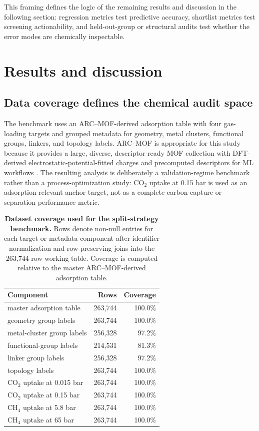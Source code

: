 \documentclass[11pt,a4paper]{article}
\begin{document}
This framing defines the logic of the remaining results and discussion in the following section: regression metrics test predictive accuracy, shortlist metrics test screening actionability, and held-out-group or structural audits test whether the error modes are chemically inspectable.


\section*{Results and discussion}
\subsection*{Data coverage defines the chemical audit space}
The benchmark uses an ARC--MOF-derived adsorption table with four gas-loading targets and grouped metadata for geometry, metal clusters, functional groups, linkers, and topology labels. ARC--MOF is appropriate for this study because it provides a large, diverse, descriptor-ready MOF collection with DFT-derived electrostatic-potential-fitted charges and precomputed descriptors for ML workflows \citep{Burner2023ARCMOF}. The resulting analysis is deliberately a validation-regime benchmark rather than a process-optimization study: CO$_2$ uptake at 0.15 bar is used as an adsorption-relevant anchor target, not as a complete carbon-capture or separation-performance metric.


\begin{table}[H]
\centering
\caption{\textbf{Dataset coverage used for the split-strategy benchmark.} Rows denote non-null entries for each target or metadata component after identifier normalization and row-preserving joins into the 263,744-row working table. Coverage is computed relative to the master ARC--MOF-derived adsorption table.}
\label{tab:coverage}
\begin{tabular}{lrr}
\toprule
Component & Rows & Coverage \\
\midrule
master adsorption table & 263,744 & 100.0\% \\
geometry group labels & 263,744 & 100.0\% \\
metal-cluster group labels & 256,328 & 97.2\% \\
functional-group labels & 214,531 & 81.3\% \\
linker group labels & 256,328 & 97.2\% \\
topology labels & 263,744 & 100.0\% \\
CO$_2$ uptake at 0.015 bar & 263,744 & 100.0\% \\
CO$_2$ uptake at 0.15 bar & 263,744 & 100.0\% \\
CH$_4$ uptake at 5.8 bar & 263,744 & 100.0\% \\
CH$_4$ uptake at 65 bar & 263,744 & 100.0\% \\
\bottomrule
\end{tabular}
\end{table}
\end{document}
